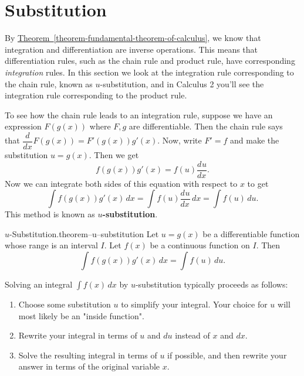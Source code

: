 \documentclass[10pt,]{book}
\newcommand{\terminology}[1]{\textbf{#1}}
\numberwithin{equation}{section}
\newcommand{\dv}[3][]{\dfrac{d^{#1} #2}{d #3^{#1}}}
\begin{document}
\section[{Substitution}]{Substitution}\label{section-substitution}
\hypertarget{p-477}{}%
By \hyperref[theorem-fundamental-theorem-of-calculus]{Theorem~\ref{theorem-fundamental-theorem-of-calculus}}, we know that integration and differentiation are inverse operations. This means that differentiation rules, such as the chain rule and product rule, have corresponding \emph{integration} rules. In this section we look at the integration rule corresponding to the chain rule, known as \(u\)-substitution, and in Calculus 2 you'll see the integration rule corresponding to the product rule.%
\par
\hypertarget{p-478}{}%
To see how the chain rule leads to an integration rule, suppose we have an expression \(F(g(x))\) where \(F,g\) are differentiable. Then the chain rule says that \(\dv{}{x}F(g(x)) = F'(g(x))g'(x).\) Now, write \(F' = f\) and make the substitution \(u = g(x)\). Then we get%
\begin{equation*}
f(g(x))g'(x) = f(u)\dv{u}{x}.
\end{equation*}
Now we can integrate both sides of this equation with respect to \(x\) to get%
\begin{equation*}
\int f(g(x))g'(x)\,dx = \int f(u)\dv{u}{x}\,dx = \int f(u)\,du.
\end{equation*}
This method is known as \terminology{\(u\)-substitution}.%
\begin{theorem}{\(u\)-Substitution.}{}{theorem--u--substitution}%
\hypertarget{p-479}{}%
Let \(u = g(x)\) be a differentiable function whose range is an interval \(I\). Let \(f(x)\) be a continuous function on \(I\). Then%
\begin{equation*}
\int f(g(x))g'(x)\,dx = \int f(u)\,du.
\end{equation*}
%
\end{theorem}
\hypertarget{p-480}{}%
Solving an integral \(\int f(x)\,dx\) by \(u\)-substitution typically proceeds as follows: \leavevmode%
\begin{enumerate}
\item\hypertarget{li-42}{}Choose some substitution \(u\) to simplify your integral. Your choice for \(u\) will most likely be an "inside function".%
\item\hypertarget{li-43}{}Rewrite your integral in terms of \(u\) and \(du\) instead of \(x\) and \(dx\).%
\item\hypertarget{li-44}{}Solve the resulting integral in terms of \(u\) if possible, and then rewrite your answer in terms of the original variable \(x\).%
\end{enumerate}
\end{document}
